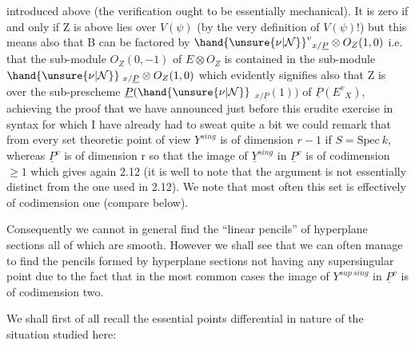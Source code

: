 
introduced above (the verification ought to be essentially
mechanical). It is zero if and only if Z is above lies over $V(\psi)$
(by the very definition of $V(\psi)$!) but this means also that B can
be factored by $\hand{\unsure{\nu|\mathcal{N}}}^{v}{}_{x/\underline{P}} \otimes O_{Z}(1,0)$ i.e. that the sub-module $O_{Z}(0,-1)$
of $E \otimes O_{Z}$ is contained in the sub-module $\hand{\unsure{\nu|\mathcal{N}}}\;{}_{x/\underline{P}} \otimes O_{Z}(1,0)$ which
evidently signifies also that Z is over the sub-prescheme $\underline{P}(\hand{\unsure{\nu|\mathcal{N}}}$
${}_{x/\underline{P}}(1))$ of $\underline{P}(E^{v}{}_{X})$, achieving the proof that we have announced just
before this erudite exercise in syntax for which I have already
had to sweat quite a bit we could remark that from every set
theoretic point of view $Y^{sing}$ is of dimension $r - 1$ if $S = \mathrm{Spec}\ k$,
whereas $\underline{P}^{v}$ is of dimension r so that the image of $\underline{Y}^{sing}$ in $\underline{P}^{v}$ is
of codimension $\geq 1$ which gives again 2.12 (it is well to note that
the argument is not essentially distinct from the one used in
2.12). We note that most often this set is effectively of
codimension one (compare below).

Consequently we cannot in general find the ``linear pencils''
of hyperplane sections all of which are smooth. However we shall
see that we can often manage to find the pencils formed by
hyperplane sections not having any supersingular point due to the
fact that in the most common cases the image of $Y^{sup\ sing}$ in $\underline{P}^{v}$ is
of codimension two.

We shall first of all recall the essential points
differential in nature of the situation studied here:
